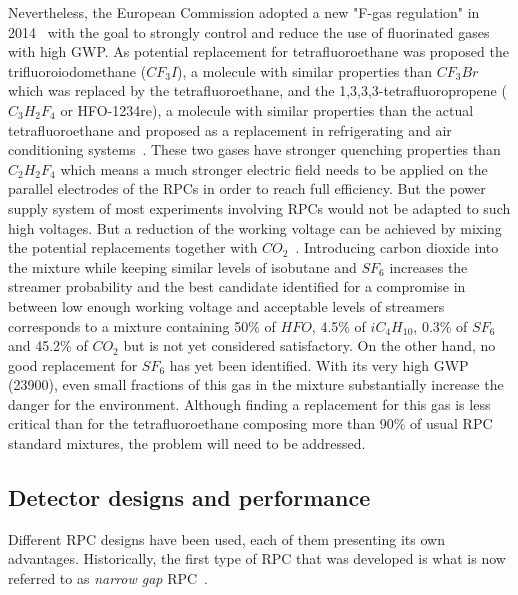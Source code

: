 	Nevertheless, the European Commission adopted a new "F-gas regulation" in 2014~\cite{EUFGAS2014} with the goal to strongly control and reduce the use of fluorinated gases with high \acf{GWP}. As potential replacement for tetrafluoroethane was proposed the trifluoroiodomethane ($CF_3I$), a molecule with similar properties than $CF_3Br$ which was replaced by the tetrafluoroethane, and the 1,3,3,3-tetrafluoropropene ($C_3H_2F_4$ or HFO-1234re), a molecule with similar properties than the actual tetrafluoroethane and proposed as a replacement in refrigerating and air conditioning systems~\cite{HFO2015}. These two gases have stronger quenching properties than $C_2H_2F_4$ which means a much stronger electric field needs to be applied on the parallel electrodes of the RPCs in order to reach full efficiency. But the power supply system of most experiments involving RPCs would not be adapted to such high voltages. But a reduction of the working voltage can be achieved by mixing the potential replacements together with $CO_2$~\cite{PICCOLO2016,PHASEIITP}. Introducing carbon dioxide into the mixture while keeping similar levels of isobutane and $SF_6$ increases the streamer probability and the best candidate identified for a compromise in between low enough working voltage and acceptable levels of streamers corresponds to a mixture containing 50\% of $HFO$, 4.5\% of $iC_4H_{10}$, 0.3\% of $SF_6$ and 45.2\% of $CO_2$ but is not yet considered satisfactory. On the other hand, no good replacement for $SF_6$ has yet been identified. With its very high \acl{GWP} (23900), even small fractions of this gas in the mixture  substantially increase the danger for the environment. Although finding a replacement for this gas is less critical than for the tetrafluoroethane composing more than 90\% of usual RPC standard mixtures, the problem will need to be addressed.
	
	\subsection{Detector designs and performance}
	\label{chapt3:ssec:design}
	
	Different RPC designs have been used, each of them presenting its own advantages. Historically, the first type of RPC that was developed is what is now referred to as \textit{narrow gap} RPC~\cite{SANTONICO81,ZEBALLOS96COMP}.
	
\begingroup\setlength{\intextsep}{0pt}\setlength{\columnsep}{15pt}
	
